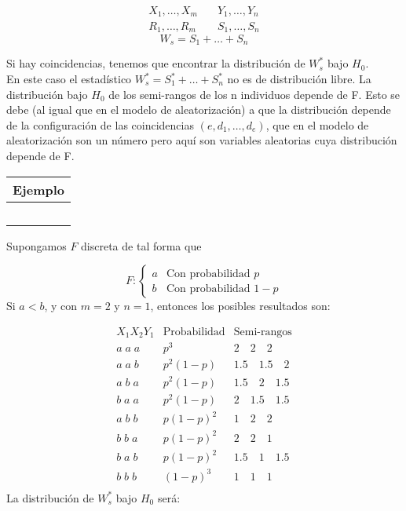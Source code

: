 $$
\begin{aligned}
    X_1,\dots, X_m & \quad Y_1,\dots,Y_n\\
    R_1,\dots, R_m & \quad S_1,\dots,S_n
\end{aligned}
$$
$$
W_s=S_1+\dots+S_n
$$

Si hay coincidencias, tenemos que encontrar la distribución de $W^*_s$ bajo $H_0$. \\
En este caso el estadístico $W^*_s=S^*_1+\dots+S^*_n$ no es de distribución libre. La distribución bajo $H_0$ de los semi-rangos de los n individuos depende de F. 
Esto se debe (al igual que en el modelo de aleatorización) a que la distribución depende de la configuración de las coincidencias $(e,d_1,\dots,d_e)$, que en el modelo de aleatorización son un número pero aquí son variables aleatorias cuya distribución depende de F.\\

\hspace{-1cm}\noindent\begin{tabular}{r}
    \textbf{Ejemplo}  \\ \hline \ \\
\end{tabular}

    Supongamos $F$ discreta de tal forma que 
    
    $$
        F:\begin{cases}
            a & \text{Con probabilidad } p \\
            b & \text{Con probabilidad } 1-p
        \end{cases}
    $$
    Si $a<b$, y con $m=2$ y $n=1$, entonces los posibles resultados son:

    $$
    \begin{array}{c|c|c}
        X_1X_2Y_1 & \text{Probabilidad} & \text{Semi-rangos} \\ \hline
        a \; a \; a & p^3 & 2 \quad 2 \quad 2 \\ 
        a \; a \; b & p^2(1-p) & 1.5 \quad 1.5 \quad 2 \\ 
        a \; b \; a & p^2(1-p) & 1.5 \quad 2 \quad 1.5 \\ 
        b \; a \; a & p^2(1-p) & 2 \quad 1.5 \quad 1.5 \\ 
        a \; b \; b & p(1-p)^2 & 1 \quad 2 \quad 2 \\ 
        b \; b \; a & p(1-p)^2 & 2 \quad 2 \quad 1 \\ 
        b \; a \; b & p(1-p)^2 & 1.5 \quad 1 \quad 1.5 \\ 
        b \; b \; b & (1-p)^3 & 1 \quad 1 \quad 1 \\ 
    \end{array}
    $$
    La distribución de $W^*_s$ bajo $H_0$ será:

